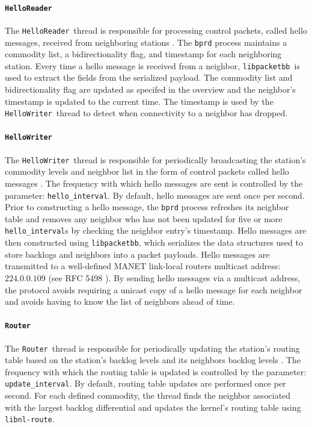 \documentclass{article}
\newcommand{\bprd}{\texttt{bprd}\xspace}
\newcommand{\hellointerval}{\texttt{hello\_interval}}
\newcommand{\helloreader}{\texttt{HelloReader}}
\newcommand{\hellowriter}{\texttt{HelloWriter}}
\newcommand{\libnlroute}{\texttt{libnl-route}}
\newcommand{\libpacketbb}{\texttt{libpacketbb}}
\newcommand{\router}{\texttt{Router}}
\newcommand{\updateinterval}{\texttt{update\_interval}}
\newcommand*\circled[1]{\tikz[baseline=(char.base)]{
                \node[shape=circle,draw,inner sep=2pt] (char) {#1};}}
\begin{document}
\paragraph{\helloreader} The \helloreader\ thread is responsible for processing control packets, called hello messages, received from neighboring stations \circled{3}.
The \bprd process maintains a commodity list, a bidirectionality flag, and timestamp for each neighboring station.
Every time a hello message is received from a neighbor, \libpacketbb\ is used to extract the fields from the serialized payload.
The commodity list and bidirectionality flag are updated as specifed in the overview and the neighbor's timestamp is updated to the current time.
The timestamp is used by the \hellowriter\ thread to detect when connectivity to a neighbor has dropped.


\paragraph{\hellowriter} The \hellowriter\ thread is responsible for periodically broadcasting the station's commodity levels and neighbor list in the form of control packets called hello messages \circled{4}.
The frequency with which hello messages are sent is controlled by the parameter: \hellointerval.
By default, hello messages are sent once per second.
Prior to constructing a hello message, the \bprd process refreshes its neighbor table and removes any neighbor who has not been updated for five or more \hellointerval s by checking the neighbor entry's timestamp.
Hello messages are then constructed using \libpacketbb, which serializes the data structures used to store backlogs and neighbors into a packet payloads.
Hello messages are transmitted to a well-defined MANET link-local routers multicast address: \(224.0.0.109\) (see RFC 5498 \cite{manet-iana-rfc}).
By sending hello messages via a multicast address, the protocol avoids requiring a unicast copy of a hello message for each neighbor and avoids having to know the list of neighbors ahead of time.


\paragraph{\router} The \router\ thread is responsible for periodically updating the station's routing table based on the station's backlog levels and its neighbors backlog levels \circled{5}.
The frequency with which the routing table is updated is controlled by the parameter: \updateinterval.
By default, routing table updates are performed once per second.
For each defined commodity, the thread finds the neighbor associated with the largest backlog differential and updates the kernel's routing table using \libnlroute.
\end{document}
